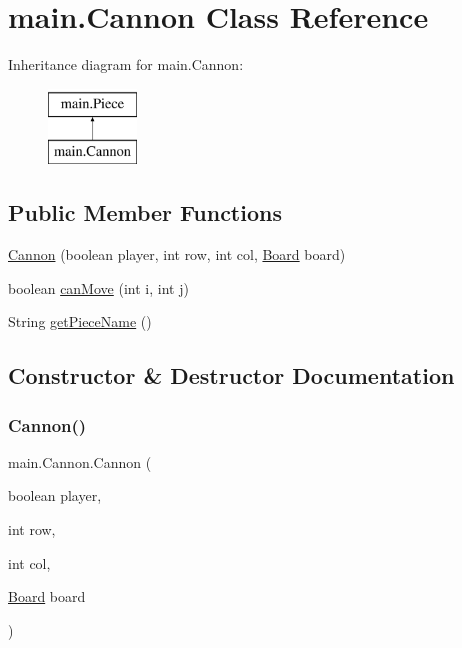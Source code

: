 \hypertarget{classmain_1_1_cannon}{}\section{main.\+Cannon Class Reference}
\label{classmain_1_1_cannon}
Inheritance diagram for main.\+Cannon\+:\begin{figure}[H]
\begin{center}
\leavevmode
\includegraphics[height=2.000000cm]{classmain_1_1_cannon}
\end{center}
\end{figure}
\subsection*{Public Member Functions}
\begin{DoxyCompactItemize}
\item 
\mbox{\hyperlink{classmain_1_1_cannon_a50babeef62b133321de8853389185c78}{Cannon}} (boolean player, int row, int col, \mbox{\hyperlink{classmain_1_1_board}{Board}} board)
\item 
boolean \mbox{\hyperlink{classmain_1_1_cannon_a374dcf636c809bb25d652f16ac469ad6}{can\+Move}} (int i, int j)
\item 
String \mbox{\hyperlink{classmain_1_1_cannon_a7d765ab4a98f0fe7e9f7c8009aedfb35}{get\+Piece\+Name}} ()
\end{DoxyCompactItemize}


\subsection{Constructor \& Destructor Documentation}
\mbox{\label{classmain_1_1_cannon_a50babeef62b133321de8853389185c78}} 
\subsubsection{\texorpdfstring{Cannon()}{Cannon()}}
{\footnotesize\ttfamily main.\+Cannon.\+Cannon (\begin{DoxyParamCaption}\item[{boolean}]{player,  }\item[{int}]{row,  }\item[{int}]{col,  }\item[{\mbox{\hyperlink{classmain_1_1_board}{Board}}}]{board }\end{DoxyParamCaption})\hspace{0.3cm}{\ttfamily [inline]}}

